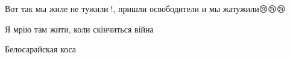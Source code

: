 
Вот так мы жиле не тужили💖!, пришли освободители и мы жатужили😢😢😢


Я мрію там жити, коли скінчиться війна


Белосарайская коса
